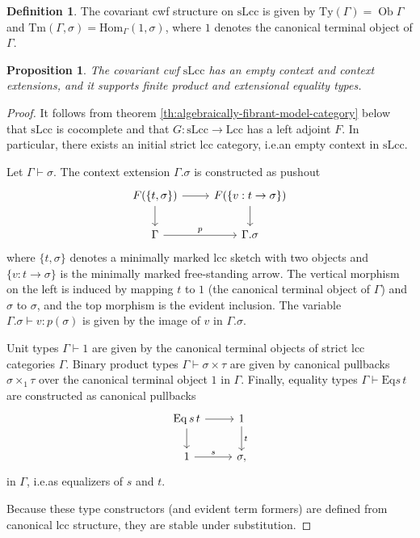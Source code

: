 \documentclass[a4paper]{article}
\newtheorem{proposition}[theorem]{Proposition}
\theoremstyle{remark}
\theoremstyle{definition}
\newtheorem{definition}[theorem]{Definition}
\begin{document}
\begin{definition}
  The covariant cwf structure on $\mathrm{sLcc}$ is given by $\mathrm{Ty}(\Gamma) = \operatorname{Ob} \Gamma$ and $\mathrm{Tm}(\Gamma, \sigma) = \mathrm{Hom}_\Gamma(1, \sigma)$, where $1$ denotes the canonical terminal object of $\Gamma$.
\end{definition}

\begin{proposition}
  \label{prop:slcc-model}
  The covariant cwf $\mathrm{sLcc}$ has an empty context and context extensions, and it supports finite product and extensional equality types.
\end{proposition}
\begin{proof}
  It follows from theorem \ref{th:algebraically-fibrant-model-category} below that $\mathrm{sLcc}$ is cocomplete and that $G : \mathrm{sLcc} \rightarrow \mathrm{Lcc}$ has a left adjoint $F$.
  In particular, there exists an initial strict lcc category, i.e.\@ an empty context in $\mathrm{sLcc}$.
  
  Let $\Gamma \vdash \sigma$.
  The context extension $\Gamma.\sigma$ is constructed as pushout
  \begin{equation}
    \label{eq:slcc-context-extension}
    \begin{tikzcd}
      F(\{ t, \sigma \}) \arrow[d] \arrow[r] & F(\{ v : t \rightarrow \sigma \}) \arrow[d] \\
      \Gamma \arrow[r, "p"] & \Gamma.\sigma
    \end{tikzcd}
  \end{equation}
  where $\{ t, \sigma \}$ denotes a minimally marked lcc sketch with two objects and $\{ v : t \rightarrow \sigma \}$ is the minimally marked free-standing arrow.
  The vertical morphism on the left is induced by mapping $t$ to $1$ (the canonical terminal object of $\Gamma$) and $\sigma$ to $\sigma$, and the top morphism is the evident inclusion.
  The variable $\Gamma.\sigma \vdash v : p(\sigma)$ is given by the image of $v$ in $\Gamma.\sigma$.

  Unit types $\Gamma \vdash 1$ are given by the canonical terminal objects of strict lcc categories $\Gamma$.
  Binary product types $\Gamma \vdash \sigma \times \tau$ are given by canonical pullbacks $\sigma \times_1 \tau$ over the canonical terminal object $1$ in $\Gamma$.
  Finally, equality types $\Gamma \vdash \mathrm{Eq} s \, t$ are constructed as canonical pullbacks
  \begin{equation}
    \begin{tikzcd}
      \operatorname{\mathrm{Eq}} s \, t \arrow[r] \arrow[d] & 1 \arrow[d, "t"] \\
      1 \arrow[r, "s"] & \sigma,
    \end{tikzcd}
  \end{equation}
  in $\Gamma$, i.e.\@ as equalizers of $s$ and $t$.

  Because these type constructors (and evident term formers) are defined from canonical lcc structure, they are stable under substitution.
\end{proof}
\end{document}
